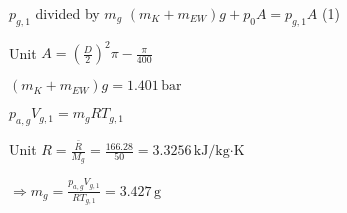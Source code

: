 \( p_{g,1} \) divided by \( m_{g} \)  
\((m_{K} + m_{EW}) g + p_{0} A = p_{g,1} A \) (1)  

Unit \( A = \left(\frac{D}{2}\right)^2 \pi - \frac{\pi}{400} \)  

\((m_{K} + m_{EW}) g = 1.401 \, \text{bar} \)  

\( p_{a,g} V_{g,1} = m_{g} R T_{g,1} \)  

Unit \( R = \frac{\bar{R}}{M_{g}} = \frac{166.28}{50} = 3.3256 \, \text{kJ/kg·K} \)  

\( \Rightarrow m_{g} = \frac{p_{a,g} V_{g,1}}{R T_{g,1}} = 3.427 \, \text{g} \)